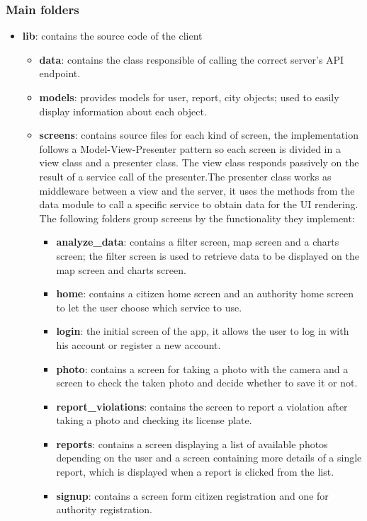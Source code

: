 \subsubsection{Main folders}
\begin{itemize}
	\item \textbf{lib}: contains the source code of the client
	\begin{itemize}
		\item \textbf{data}: contains the class responsible of calling the correct server's API endpoint.
		\item \textbf{models}: provides models for user, report, city objects; used to easily display information about each object.
		\item \textbf{screens}: contains source files for each kind of screen, the implementation follows a Model-View-Presenter pattern so each screen is divided in a view class and a presenter class. The view class responds passively on the result of a service call of the presenter.The presenter class works as middleware between a view and the server, it uses the methods from the data module to call a specific service to obtain data for the UI rendering. The following folders group screens by the functionality they implement:
		\begin{itemize}[label=]
			\item \textbf{analyze\_data}: contains a filter screen, map screen and a charts screen; the filter screen is used to retrieve data to be displayed on the map screen and charts screen.
			\item \textbf{home}: contains a citizen home screen and an authority home screen to let the user choose which service to use.
			\item \textbf{login}: the initial screen of the app, it allows the user to log in with his account or register a new account.
			\item \textbf{photo}: contains a screen for taking a photo with the camera and a screen to check the taken photo and decide whether to save it or not.
			\item \textbf{report\_violations}: contains the screen to report a violation after taking a photo and checking its license plate.
			\item \textbf{reports}: contains a screen displaying a list of available photos depending on the user and a screen containing more details of a single report, which is displayed when a report is clicked from the list.
			\item \textbf{signup}: contains a screen form citizen registration and one for authority registration.

\end{itemize}
\end{itemize}
\end{itemize}
